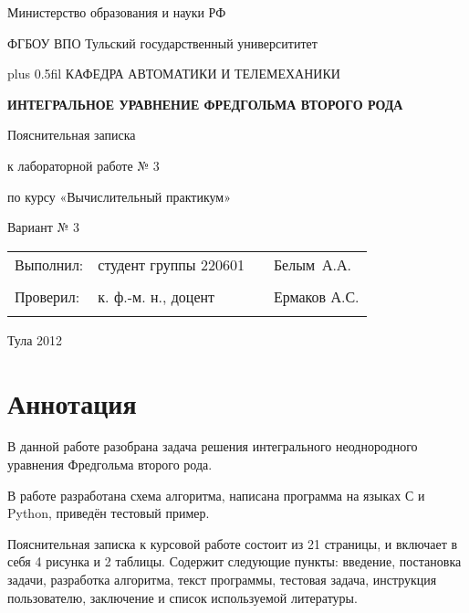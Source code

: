\documentclass[a4paper,12pt,russian]{article}
\makeatletter
\renewcommand{\normalfont}{\fontsize{14}{20}\fontfamily{ftm}\linespread{1.25}\selectfont}
\renewcommand{\tiny}{\fontsize{12}{14}\fontfamily{ftm}\linespread{1.0}\selectfont}
\renewcommand{\maketitle}[2]{
\begin{titlepage}
\begin{center}\linespread{1}\parskip=0.0cm\normalfont
Министерство образования и науки РФ

ФГБОУ ВПО Тульский государственный университитет

\vskip 0pt plus 0.5fil
КАФЕДРА АВТОМАТИКИ И ТЕЛЕМЕХАНИКИ

\vfill
\textbf{#1}

\vskip 2cm
Пояснительная записка 

к лабораторной работе № #2


по курсу «Вычислительный практикум»

\vfill
Вариант № 3

\vfill
\begin{tabular*}{\textwidth}{ll@{\extracolsep{\fill}}c@{\extracolsep{0pt}}l}
Выполнил: & студент группы 220601&&Белым~А.А.\\ \cline{3-3}
								&&\tiny{(подпись)}& 	\\
Проверил: & к. ф.-м. н., доцент &&Ермаков А.С.\\ \cline{3-3}
								&&\tiny{(подпись)}& 	\\
\end{tabular*}
\vfill
Тула 2012
\end{center}
\end{titlepage}
}
\newcommand{\ssec}[1]{\section{#1}\hspace*{\parindent}}
\makeatother
\begin{document}
\maketitle {ИНТЕГРАЛЬНОЕ УРАВНЕНИЕ ФРЕДГОЛЬМА ВТОРОГО РОДА}{3}
\ssec{Аннотация}
\normalfont
В данной работе разобрана задача решения интегрального неоднородного уравнения Фредгольма второго рода.

В работе разработана схема алгоритма, написана программа на языках С и Python, приведён тестовый пример.

Пояснительная записка к курсовой работе состоит из 21 страницы, и включает в себя 4 рисунка и 2 таблицы. Содержит следующие пункты: введение, постановка задачи, разработка алгоритма, текст программы, тестовая задача, инструкция пользователю, заключение и список используемой литературы.
\end{document}
